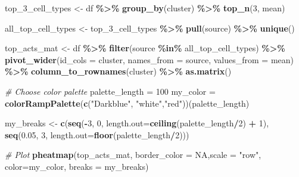 \documentclass[
]{article}
\newenvironment{Shaded}{\begin{snugshade}}{\end{snugshade}}
\newcommand{\AttributeTok}[1]{\textcolor[rgb]{0.13,0.29,0.53}{#1}}
\newcommand{\CommentTok}[1]{\textcolor[rgb]{0.56,0.35,0.01}{\textit{#1}}}
\newcommand{\ConstantTok}[1]{\textcolor[rgb]{0.56,0.35,0.01}{#1}}
\newcommand{\DecValTok}[1]{\textcolor[rgb]{0.00,0.00,0.81}{#1}}
\newcommand{\FloatTok}[1]{\textcolor[rgb]{0.00,0.00,0.81}{#1}}
\newcommand{\FunctionTok}[1]{\textcolor[rgb]{0.13,0.29,0.53}{\textbf{#1}}}
\newcommand{\NormalTok}[1]{#1}
\newcommand{\OtherTok}[1]{\textcolor[rgb]{0.56,0.35,0.01}{#1}}
\newcommand{\SpecialCharTok}[1]{\textcolor[rgb]{0.81,0.36,0.00}{\textbf{#1}}}
\newcommand{\StringTok}[1]{\textcolor[rgb]{0.31,0.60,0.02}{#1}}
\begin{document}
\begin{Shaded}
\begin{Highlighting}[]
\NormalTok{top\_3\_cell\_types }\OtherTok{\textless{}{-}}\NormalTok{ df }\SpecialCharTok{\%\textgreater{}\%}
    \FunctionTok{group\_by}\NormalTok{(cluster) }\SpecialCharTok{\%\textgreater{}\%}
    \FunctionTok{top\_n}\NormalTok{(}\DecValTok{3}\NormalTok{, mean)}

\NormalTok{all\_top\_cell\_types }\OtherTok{\textless{}{-}}\NormalTok{ top\_3\_cell\_types }\SpecialCharTok{\%\textgreater{}\%} \FunctionTok{pull}\NormalTok{(source) }\SpecialCharTok{\%\textgreater{}\%} \FunctionTok{unique}\NormalTok{()}

\NormalTok{top\_acts\_mat }\OtherTok{\textless{}{-}}\NormalTok{ df }\SpecialCharTok{\%\textgreater{}\%}
  \FunctionTok{filter}\NormalTok{(source }\SpecialCharTok{\%in\%}\NormalTok{ all\_top\_cell\_types) }\SpecialCharTok{\%\textgreater{}\%}
  \FunctionTok{pivot\_wider}\NormalTok{(}\AttributeTok{id\_cols =} \StringTok{\textquotesingle{}cluster\textquotesingle{}}\NormalTok{, }\AttributeTok{names\_from =} \StringTok{\textquotesingle{}source\textquotesingle{}}\NormalTok{,}
              \AttributeTok{values\_from =} \StringTok{\textquotesingle{}mean\textquotesingle{}}\NormalTok{) }\SpecialCharTok{\%\textgreater{}\%}
  \FunctionTok{column\_to\_rownames}\NormalTok{(}\StringTok{\textquotesingle{}cluster\textquotesingle{}}\NormalTok{) }\SpecialCharTok{\%\textgreater{}\%}
  \FunctionTok{as.matrix}\NormalTok{()}

\CommentTok{\# Choose color palette}
\NormalTok{palette\_length }\OtherTok{=} \DecValTok{100}
\NormalTok{my\_color }\OtherTok{=} \FunctionTok{colorRampPalette}\NormalTok{(}\FunctionTok{c}\NormalTok{(}\StringTok{"Darkblue"}\NormalTok{, }\StringTok{"white"}\NormalTok{,}\StringTok{"red"}\NormalTok{))(palette\_length)}

\NormalTok{my\_breaks }\OtherTok{\textless{}{-}} \FunctionTok{c}\NormalTok{(}\FunctionTok{seq}\NormalTok{(}\SpecialCharTok{{-}}\DecValTok{3}\NormalTok{, }\DecValTok{0}\NormalTok{, }\AttributeTok{length.out=}\FunctionTok{ceiling}\NormalTok{(palette\_length}\SpecialCharTok{/}\DecValTok{2}\NormalTok{) }\SpecialCharTok{+} \DecValTok{1}\NormalTok{),}
               \FunctionTok{seq}\NormalTok{(}\FloatTok{0.05}\NormalTok{, }\DecValTok{3}\NormalTok{, }\AttributeTok{length.out=}\FunctionTok{floor}\NormalTok{(palette\_length}\SpecialCharTok{/}\DecValTok{2}\NormalTok{)))}

\CommentTok{\# Plot}
\FunctionTok{pheatmap}\NormalTok{(top\_acts\_mat, }\AttributeTok{border\_color =} \ConstantTok{NA}\NormalTok{,}\AttributeTok{scale =} \StringTok{"row"}\NormalTok{, }\AttributeTok{color=}\NormalTok{my\_color, }\AttributeTok{breaks =}\NormalTok{ my\_breaks)}
\end{Highlighting}
\end{Shaded}
\end{document}
